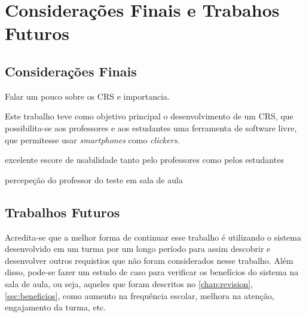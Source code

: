 \chapter{Considerações Finais e Trabahos Futuros}

\section{Considerações Finais}

Falar um pouco sobre os CRS e importancia.

Este trabalho teve como objetivo principal o desenvolvimento de um CRS,
que possibilita-se aos professores e aos estudantes uma ferramenta de software livre,
que permitesse usar {\textit{smartphones}} como \textit{clickers}.

excelente escore de usabilidade tanto pelo professores como pelos estudantes

percepeção do professor do teste em sala de aula

%


\section{Trabalhos Futuros}

Acredita-se que a melhor forma de continuar esse trabalho é utilizando o sistema
desenvolvido em um turma por um longo período para assim descobrir e desenvolver outros requistios que não
foram considerados nesse trabalho. Além disso, pode-se fazer um estudo de caso para verificar os benefícios
do sistema na sala de aula, ou seja, aqueles que foram descritos no \autoref{chap:revision}, \autoref{sec:beneficios},
como aumento na frequência escolar, melhora na atenção, engajamento da turma, etc.
